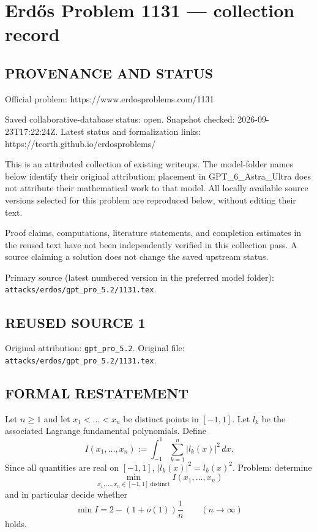 \section*{Erd\H{o}s Problem 1131 --- collection record}

\subsection*{PROVENANCE AND STATUS}
Official problem: https://www.erdosproblems.com/1131

Saved collaborative-database status: open.
Snapshot checked: 2026-09-23T17:22:24Z.
Latest status and formalization links: https://teorth.github.io/erdosproblems/

This is an attributed collection of existing writeups. The model-folder names below identify their original attribution; placement in GPT\_6\_Astra\_Ultra does not attribute their mathematical work to that model. All locally available source versions selected for this problem are reproduced below, without editing their text.

Proof claims, computations, literature statements, and completion estimates in the reused text have not been independently verified in this collection pass. A source claiming a solution does not change the saved upstream status.

Primary source (latest numbered version in the preferred model folder): \texttt{attacks/erdos/gpt\_pro\_5.2/1131.tex}.

\subsection*{REUSED SOURCE 1}
Original attribution: \texttt{gpt\_pro\_5.2}.
Original file: \texttt{attacks/erdos/gpt\_pro\_5.2/1131.tex}.


\subsection*{FORMAL RESTATEMENT}
Let $n\ge 1$ and let $x_1<\dots<x_n$ be distinct points in $[-1,1]$.
Let $l_k$ be the associated Lagrange fundamental polynomials.
Define
\[
I(x_1,\dots,x_n):=\int_{-1}^1\sum_{k=1}^n |l_k(x)|^2\,dx.
\]
Since all quantities are real on $[-1,1]$, $|l_k(x)|^2=l_k(x)^2$.
Problem: determine
\[
\min_{x_1,\dots,x_n\in[-1,1]\ \text{distinct}} I(x_1,\dots,x_n)
\]
and in particular decide whether
\[
\min I = 2-(1+o(1))\frac{1}{n}\qquad (n\to\infty)
\]
holds.

